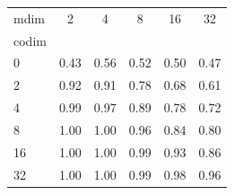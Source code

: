 \begin{tabular}{l|ccccc}
\toprule
mdim & 2 & \textcolor{blue!70!black}{4} & 8 & 16 & 32 \\
codim &  &  &  &  &  \\
\midrule
0 & 0.43 & \textcolor{blue!70!black}{0.56} & 0.52 & 0.50 & 0.47 \\
2 & 0.92 & \textcolor{blue!70!black}{0.91} & 0.78 & 0.68 & 0.61 \\
\textcolor{red!70!black}{4} & \textcolor{red!70!black}{0.99} & \textcolor{purple!70!black}{0.97} & \textcolor{red!70!black}{0.89} & \textcolor{red!70!black}{0.78} & \textcolor{red!70!black}{0.72} \\
8 & 1.00 & \textcolor{blue!70!black}{1.00} & 0.96 & 0.84 & 0.80 \\
16 & 1.00 & \textcolor{blue!70!black}{1.00} & 0.99 & 0.93 & 0.86 \\
32 & 1.00 & \textcolor{blue!70!black}{1.00} & 0.99 & 0.98 & 0.96 \\
\bottomrule
\end{tabular}
